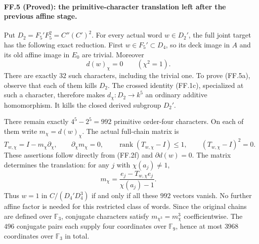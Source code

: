 \paragraph{FF.5 (Proved): the primitive-character translation left after the previous affine stage.}
Put $D_2=F_5'F_5^2=C''(C')^2$. For every actual word
$w\in D_2'$, the full joint target has the following exact
reduction. First $w\in F_5'\subset D_4$, so its deck image
in $A$ and its old affine image in $E_0$ are trivial. Moreover
\[
                    d(w)_\chi=0\qquad(\chi^2=1).
 \tag{FF.5a}
\]
There are exactly $32$ such characters, including the trivial
one. To prove (FF.5a), observe that each of them kills $D_2$.
The crossed identity (FF.1c), specialized at such a character,
therefore makes $d_\chi:D_2\to k^5$ an ordinary additive
homomorphism. It kills the closed derived subgroup $D_2'$.

There remain exactly $4^5-2^5=992$ primitive order-four
characters. On each of them write $m_\chi=d(w)_\chi$. The
actual full-chain matrix is
\[
 T_{w,\chi}=I-m_\chi\partial_\chi,\qquad
 \partial_\chi m_\chi=0,\qquad
 \operatorname{rank}(T_{w,\chi}-I)\leq1,\qquad
 (T_{w,\chi}-I)^2=0.
 \tag{FF.5b}
\]
These assertions follow directly from (FF.2f) and
$\partial d(w)=0$. The matrix determines the translation:
for any $j$ with $\chi(a_j)\ne1$,
\[
             m_\chi=
 \frac{e_j-T_{w,\chi}e_j}{\chi(a_j)-1}.
 \tag{FF.5c}
\]
Thus $w=1$ in $C/(D_4'D_4^3)$ if and only if all these
$992$ vectors vanish. No further affine factor is needed
for this restricted class of words. Since the original
chains are defined over $\mathbb F_3$, conjugate characters
satisfy $m_{\chi^3}=m_\chi^3$ coefficientwise. The $496$
conjugate pairs each supply four coordinates over
$\mathbb F_9$, hence at most $3968$ coordinates over
$\mathbb F_3$ in total.

